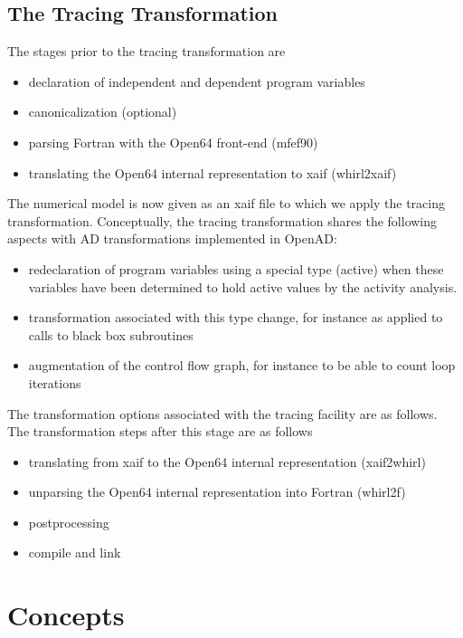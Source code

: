 \documentclass{article}
\begin{document}
\subsection{The Tracing Transformation}
The stages prior to the tracing transformation are 
\begin{itemize}
\item declaration of independent and dependent program variables
\item canonicalization (optional)
\item parsing Fortran with the Open64 front-end (mfef90)
\item translating the Open64 internal representation to xaif (whirl2xaif)
\end{itemize}
The numerical model is now given as an xaif file to which we apply the tracing transformation. 
Conceptually, the tracing transformation shares the following aspects with AD transformations implemented in 
OpenAD:
\begin{itemize}
\item redeclaration of program variables using a special type (active) when these variables 
	have been determined to hold active values by the activity analysis.
\item transformation associated with this type change, for instance as  applied to 
	calls to black box subroutines
\item augmentation of the control flow graph, for instance to be able to count loop iterations
\end{itemize}
The transformation options associated with the tracing facility are as follows.
{\tiny
{}
}
The transformation steps after this stage are as follows
\begin{itemize}
\item translating from xaif to the Open64 internal representation (xaif2whirl)
\item unparsing the Open64 internal representation into Fortran (whirl2f)
\item postprocessing
\item compile and link
\end{itemize}



\section{Concepts}
\end{document}
